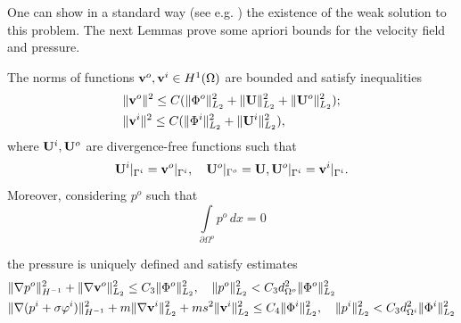 \documentclass{amsart}
\begin{document}
One can show in a standard way (see e.g. \cite{Lions}) the existence of the weak solution to this problem. The next Lemmas prove some apriori bounds for the velocity field and pressure. 

\begin{lemma}\label{L1}
The norms of functions ${\bf v}^o,{\bf v}^i\in H^1(\Omega)$  are bounded and satisfy inequalities
\begin{equation}\label{normsv}
\begin{aligned}
&\|{\bf v}^o\|^2\leq C(\|\Phi^o\|^2_{L_2}+\|{\bf U}\|^2_{L_2}+\|{\bf U}^o\|^2_{L_2});\\
&\|{\bf v}^i\|^2\leq C(\|\Phi^i\|^2_{L_2}+\|{\bf U}^i\|^2_{L_2}),
\end{aligned}
\end{equation}
where ${\bf U}^i, {\bf U}^o$ are divergence-free functions such that
$${\bf U}^i|_{\Gamma^i}={\bf v}^o|_{\Gamma^i}, \quad {\bf U}^o|_{\Gamma^o}={\bf U}, {\bf U}^o|_{\Gamma^i}={\bf v}^i|_{\Gamma^i}.$$
Moreover, considering $p^o$ such that
\begin{equation}\label{pressure_mean}
\int\limits_{\partial\Omega^o}p^o\,dx=0
\end{equation}

 the pressure is uniquely defined and satisfy estimates
\begin{equation}\label{normspressure}
\begin{aligned}
&\|\nabla p^o\|^2_{H^{-1}}+\|\nabla {\bf v}^o\|^2_{L_2}\leq C_3\|\Phi^o\|^2_{L_2}, \quad \| p^o\|^2_{L_2}< C_3d^2_{\Omega^o}\|\Phi^o\|^2_{L_2}\\
&\|\nabla (p^i+\sigma \varphi^i)\|^2_{H^{-1}}+m\|\nabla {\bf v}^i\|^2_{L_2}+ms^2\| {\bf v}^i\|^2_{L_2}\leq C_4\|\Phi^i\|^2_{L_2}, \quad \| p^i\|^2_{L_2}< C_3d^2_{\Omega^i}\|\Phi^i\|^2_{L_2}
\end{aligned}
\end{equation}
\end{lemma}
\end{document}
